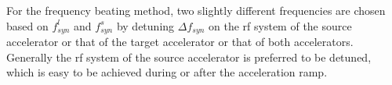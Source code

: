 %
For the frequency beating method, two slightly different frequencies are chosen based on $f_{\mathit{syn}}^{l}$ and $f_{\mathit{syn}}^{s}$ by detuning $\Delta f_\mathit{syn}$ on the rf system of the source accelerator or that of the target accelerator or that of both accelerators. Generally the rf system of the source accelerator is preferred to be detuned, which is easy to be achieved during or after the acceleration ramp. 


